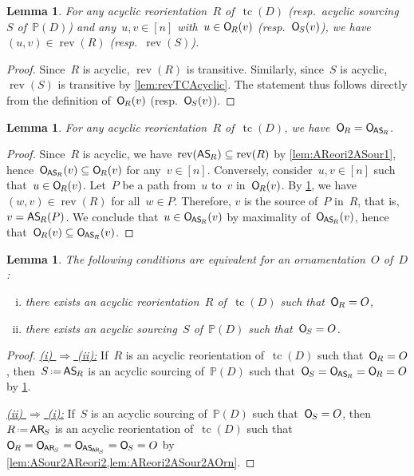 \documentclass{amsart}
\newtheorem{lemma}[theorem]{Lemma}
\theoremstyle{definition}
\newcommand{\eqdef}{\mbox{\,\raisebox{0.2ex}{\scriptsize\ensuremath{\mathrm:}}\ensuremath{=}\,}} %
\DeclareMathOperator{\tc}{tc} %
\newcommand{\mymap}[2]{\mathsf{#1}_{\hspace{-.7pt}#2}}
\newcommand{\orn}[1]{\mymap{O}{#1}}  %
\newcommand{\areori}[1]{\mymap{AR}{#1}}  %
\DeclareMathOperator{\rev}{rev} %
\newcommand{\asour}[1]{\mymap{AS}{#1}}  %
\newcommand{\PP}{\mathbb P} %
\begin{document}
\begin{lemma}
\label{lem:acyclicSimplifiesDef}
For any acyclic reorientation~$R$ of~$\tc(D)$ (resp.~acyclic sourcing~$S$ of~$\PP(D)$) and any~$u,v \in [n]$ with~$u \in \orn{R}(v)$ (resp.~$\orn{S}(v)$), we have~$(u,v) \in \rev(R)$ (resp.~$\rev(S)$).
\end{lemma}

\begin{proof}
Since~$R$ is acyclic, $\rev(R)$ is transitive.
Similarly, since~$S$ is acyclic, $\rev(S)$ is transitive by \cref{lem:revTCAcyclic}.
The statement thus follows directly from the definition of~$\orn{R}(v)$ (resp.~$\orn{S}(v)$).
\end{proof}

\begin{lemma}
\label{lem:AReori2ASour2AOrn}
For any acyclic reorientation~$R$ of~$\tc(D)$, we have~$\orn{R} = \orn{\asour{R}}$.
\end{lemma}

\begin{proof}
Since~$R$ is acyclic, we have~$\rev(\asour{R}) \subseteq \rev(R)$ by \cref{lem:AReori2ASour1}, hence~$\orn{\asour{R}}(v) \subseteq \orn{R}(v)$ for any~$v \in [n]$.
Conversely, consider~$u,v \in [n]$ such that~$u \in \orn{R}(v)$.
Let~$P$ be a path from~$u$ to~$v$ in~$\orn{R}(v)$.
By \cref{lem:acyclicSimplifiesDef}, we have~$(w,v) \in \rev(R)$ for all~$w \in P$.
Therefore, $v$ is the source of~$P$ in~$R$, that is, $v = \asour{R}(P)$.
We conclude that~$u \in \orn{\asour{R}}(v)$ by maximality of~$\orn{\asour{R}}(v)$, hence that~$\orn{R}(v) \subseteq \orn{\asour{R}}(v)$.
\end{proof}

\begin{lemma}
\label{lem:AOrn2}
The following conditions are equivalent for an ornamentation~$O$ of~$D$:
\begin{enumerate}[(i)]
\item there exists an acyclic reorientation~$R$ of~$\tc(D)$ such that~$\orn{R} = O$,
\item there exists an acyclic sourcing~$S$ of~$\PP(D)$ such that~$\orn{S} = O$.
\end{enumerate}
\end{lemma}

\begin{proof}
\uline{\textsl{(i) $\Rightarrow$ (ii):}}
If~$R$ is an acyclic reorientation of~$\tc(D)$ such that~$\orn{R} = O$, then~$S \eqdef \asour{R}$ is an acyclic sourcing of~$\PP(D)$ such that~$\orn{S} = \orn{\asour{R}} = \orn{R} = O$ by \cref{lem:AReori2ASour2AOrn}.

\medskip\noindent
\uline{\textsl{(ii) $\Rightarrow$ (i):}}
If~$S$ is an acyclic sourcing of~$\PP(D)$ such that~$\orn{S} = O$, then~$R \eqdef \areori{S}$ is an acyclic reorientation of~$\tc(D)$ such that~$\orn{R} = \orn{\areori{S}} = \orn{\asour{\areori{S}}} = \orn{S} = O$ by \cref{lem:ASour2AReori2,lem:AReori2ASour2AOrn}.
\end{proof}
\end{document}
